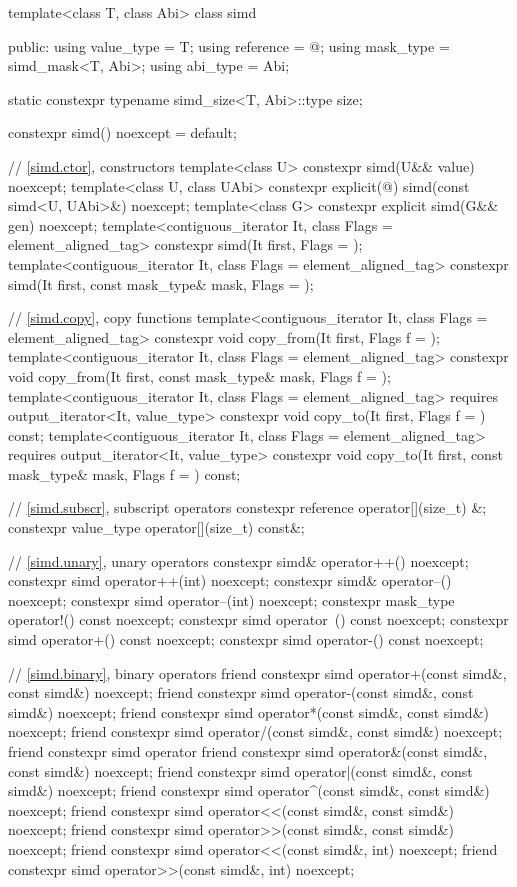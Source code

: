 \begin{codeblock}
template<class T, class Abi> class simd {
public:
  using value_type = T;
  using reference = @\seebelow@;
  using mask_type = simd_mask<T, Abi>;
  using abi_type = Abi;

  static constexpr typename simd_size<T, Abi>::type size;

  constexpr simd() noexcept = default;

  // \ref{simd.ctor},  constructors
  template<class U> constexpr simd(U&& value) noexcept;
  template<class U, class UAbi>
    constexpr explicit(@\seebelow@) simd(const simd<U, UAbi>&) noexcept;
  template<class G> constexpr explicit simd(G&& gen) noexcept;
  template<contiguous_iterator It, class Flags = element_aligned_tag>
    constexpr simd(It first, Flags = {});
  template<contiguous_iterator It, class Flags = element_aligned_tag>
    constexpr simd(It first, const mask_type& mask, Flags = {});

  // \ref{simd.copy},  copy functions
  template<contiguous_iterator It, class Flags = element_aligned_tag>
    constexpr void copy_from(It first, Flags f = {});
  template<contiguous_iterator It, class Flags = element_aligned_tag>
    constexpr void copy_from(It first, const mask_type& mask, Flags f = {});
  template<contiguous_iterator It, class Flags = element_aligned_tag>
    requires output_iterator<It, value_type>
    constexpr void copy_to(It first, Flags f = {}) const;
  template<contiguous_iterator It, class Flags = element_aligned_tag>
    requires output_iterator<It, value_type>
    constexpr void copy_to(It first, const mask_type& mask, Flags f = {}) const;

  // \ref{simd.subscr},  subscript operators
  constexpr reference operator[](size_t) &;
  constexpr value_type operator[](size_t) const&;

  // \ref{simd.unary},  unary operators
  constexpr simd& operator++() noexcept;
  constexpr simd operator++(int) noexcept;
  constexpr simd& operator--() noexcept;
  constexpr simd operator--(int) noexcept;
  constexpr mask_type operator!() const noexcept;
  constexpr simd operator~() const noexcept;
  constexpr simd operator+() const noexcept;
  constexpr simd operator-() const noexcept;

  // \ref{simd.binary},  binary operators
  friend constexpr simd operator+(const simd&, const simd&) noexcept;
  friend constexpr simd operator-(const simd&, const simd&) noexcept;
  friend constexpr simd operator*(const simd&, const simd&) noexcept;
  friend constexpr simd operator/(const simd&, const simd&) noexcept;
  friend constexpr simd operator%
  friend constexpr simd operator&(const simd&, const simd&) noexcept;
  friend constexpr simd operator|(const simd&, const simd&) noexcept;
  friend constexpr simd operator^(const simd&, const simd&) noexcept;
  friend constexpr simd operator<<(const simd&, const simd&) noexcept;
  friend constexpr simd operator>>(const simd&, const simd&) noexcept;
  friend constexpr simd operator<<(const simd&, int) noexcept;
  friend constexpr simd operator>>(const simd&, int) noexcept;

}
\end{codeblock}
